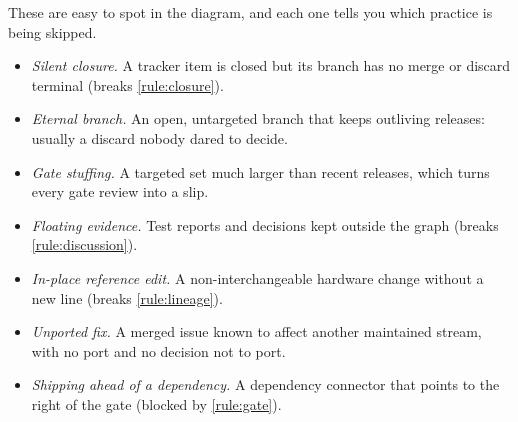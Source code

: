 These are easy to spot in the diagram, and each one tells you which
practice is being skipped.

\begin{itemize}[leftmargin=*,itemsep=1pt]
  \item \emph{Silent closure.} A tracker item is closed but its branch has
    no merge or discard terminal (breaks \cref{rule:closure}).
  \item \emph{Eternal branch.} An open, untargeted branch that keeps
    outliving releases: usually a discard nobody dared to decide.
  \item \emph{Gate stuffing.} A targeted set much larger than recent
    releases, which turns every gate review into a slip.
  \item \emph{Floating evidence.} Test reports and decisions kept outside
    the graph (breaks \cref{rule:discussion}).
  \item \emph{In-place reference edit.} A non-interchangeable hardware
    change without a new line (breaks \cref{rule:lineage}).
  \item \emph{Unported fix.} A merged issue known to affect another
    maintained stream, with no port and no decision not to port.
  \item \emph{Shipping ahead of a dependency.} A dependency connector that
    points to the right of the gate (blocked by \cref{rule:gate}).
\end{itemize}
